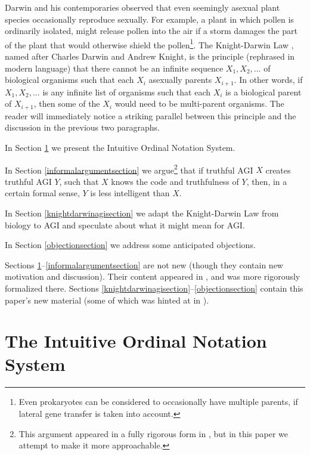 \documentclass[runningheads]{llncs}
\begin{document}
Darwin and his contemporaries observed that even
seemingly asexual plant species occasionally reproduce sexually.
For example, a plant in which pollen is ordinarily isolated, might
release pollen into the air if a storm damages the part of the
plant that would otherwise shield the pollen\footnote{Even prokaryotes can
be considered to occasionally have multiple parents, if lateral gene
transfer is taken into account.}.
The Knight-Darwin Law \cite{darwin1898knight}, named after Charles Darwin
and Andrew Knight, is the
principle (rephrased in modern language) that there cannot be an infinite
sequence $X_1,X_2,\ldots$ of biological organisms such that each $X_i$ asexually
parents $X_{i+1}$. In other words, if $X_1,X_2,\ldots$ is any infinite list of
organisms such that each $X_i$ is a biological parent of $X_{i+1}$, then some of the
$X_i$ would need to be multi-parent organisms.
The reader will immediately notice a striking parallel between
this principle and the discussion in the previous two paragraphs.

In Section \ref{notationsystemsection} we present the Intuitive Ordinal Notation
System.

In Section \ref{informalargumentsection} we argue\footnote{This argument appeared
in a fully rigorous form in \cite{alexander2019measuring},
but in this paper we attempt to make it more approachable.} that if truthful AGI $X$ creates
truthful AGI $Y$, such that $X$
knows the code and truthfulness of $Y$, then, in a certain formal sense, $Y$ is
less intelligent
than $X$.

In Section \ref{knightdarwinagisection} we adapt the Knight-Darwin Law from biology to AGI
and speculate about what it might mean for AGI.

In Section \ref{objectionsection} we address some anticipated objections.


Sections \ref{notationsystemsection}--\ref{informalargumentsection} are not new
(though they contain new motivation and discussion). Their content appeared in
\cite{alexander2019measuring}, and was more rigorously formalized there.
Sections \ref{knightdarwinagisection}--\ref{objectionsection} contain this paper's
new material (some of which was hinted at in \cite{alexander2019measuring}).

\section{The Intuitive Ordinal Notation System}
\label{notationsystemsection}
\end{document}
